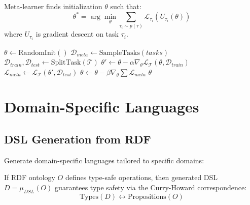 \begin{definition}
    Meta-learner finds initialization $\theta$ such that:
    \begin{equation}
        \theta^* = \arg\min_{\theta} \sum_{\tau_i \sim p(\tau)} \mathcal{L}_{\tau_i}(U_{\tau_i}(\theta))
    \end{equation}
    where $U_{\tau_i}$ is gradient descent on task $\tau_i$.
\end{definition}

\begin{algorithm}
\caption{MAML Algorithm}
\begin{algorithmic}[1]
    \State $\theta \gets \text{RandomInit}()$
        \State $\mathcal{D}_{meta} \gets \text{SampleTasks}(tasks)$
            \State $\mathcal{D}_{train}, \mathcal{D}_{test} \gets \text{SplitTask}(\mathcal{T})$
            \State $\theta' \gets \theta - \alpha \nabla_{\theta} \mathcal{L}_{\mathcal{T}}(\theta, \mathcal{D}_{train})$
            \State $\mathcal{L}_{meta} \gets \mathcal{L}_{\mathcal{T}}(\theta', \mathcal{D}_{test})$
        \EndFor
        \State $\theta \gets \theta - \beta \nabla_{\theta} \sum \mathcal{L}_{meta}$
    \EndFor
    \State \Return $\theta$
\EndProcedure
\end{algorithmic}
\end{algorithm}

\section{Domain-Specific Languages}

\subsection{DSL Generation from RDF}

Generate domain-specific languages tailored to specific domains:

\begin{theorem}
    If RDF ontology $O$ defines type-safe operations, then generated DSL $D = \mu_{DSL}(O)$ guarantees type safety via the Curry-Howard correspondence:
    \begin{equation}
        \text{Types}(D) \leftrightarrow \text{Propositions}(O)
    \end{equation}
\end{theorem}


